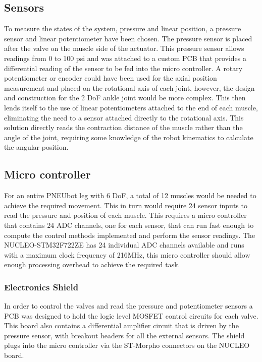 \documentclass[11pt,a4paper]{article}
\begin{document}
\subsection{Sensors}
\label{sub:sensors}
To measure the states of the system, pressure and linear position, a pressure sensor and linear potentiometer have been chosen. The pressure sensor is placed after the valve on the muscle side of the actuator. This pressure sensor \cite{NBPLANN100PGUNV} allows readings from 0 to 100 psi and was attached to a custom PCB that provides a differential reading of the sensor to be fed into the micro controller. A rotary potentiometer or encoder could have been used for the axial position measurement and placed on the rotational axis of each joint, however, the design and construction for the 2 DoF ankle joint would be more complex. This then lends itself to the use of linear potentiometers attached to the end of each muscle, eliminating the need to a sensor attached directly to the rotational axis. This solution directly reads the contraction distance of the muscle rather than the angle of the joint, requiring some knowledge of the robot kinematics to calculate the angular position.

\subsection{Micro controller}
\label{sub:microcontroller}
For an entire PNEUbot leg with 6 DoF, a total of 12 muscles would be needed to achieve the required movement. This in turn would require 24 sensor inputs to read the pressure and position of each muscle. This requires a micro controller that contains 24 ADC channels, one for each sensor, that can run fast enough to compute the control methods implemented and perform the sensor readings. The NUCLEO-STM32F722ZE \cite{nucleo_stm32f722ze} has 24 individual ADC channels available and runs with a maximum clock frequency of 216MHz, this micro controller should allow enough processing overhead to achieve the required task.

\subsubsection{Electronics Shield}
\label{sub:shield}
In order to control the valves and read the pressure and potentiometer sensors a PCB was designed to hold the logic level MOSFET control circuits for each valve. This board also contains a differential amplifier circuit that is driven by the pressure sensor, with breakout headers for all the external sensors. The shield plugs into the micro controller via the ST-Morpho connectors on the NUCLEO board. %
\end{document}
